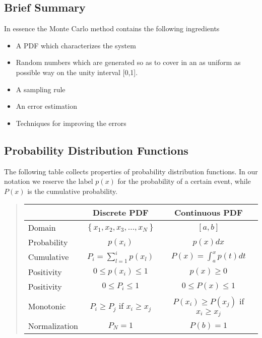 \documentclass[%
oneside,                 %
final,                   %
10pt]{article}
\newenvironment{block_mdfboxadmon}[1][]{
\begin{block_mdfboxmdframed}[frametitle=#1]
}
{
\end{block_mdfboxmdframed}
}
\begin{document}
\subsection{Brief Summary}

In essence the Monte Carlo method  contains the following ingredients

\begin{itemize}
  \item A PDF which characterizes the system

  \item Random numbers which are generated so as to cover in an as uniform as  possible way on the unity interval [0,1].

  \item A sampling rule

  \item An error estimation

  \item Techniques for improving the errors
\end{itemize}

\noindent
\subsection{Probability Distribution Functions}

\begin{block_mdfboxadmon}[]

The following table collects properties of probability distribution functions.
In our notation we reserve the label $p(x)$ for the probability of a certain event,
while $P(x)$ is the cumulative probability. 



\begin{quote}
\begin{tabular}{lcc}
\hline
\multicolumn{1}{c}{  } & \multicolumn{1}{c}{ Discrete PDF } & \multicolumn{1}{c}{ Continuous PDF } \\
\hline
Domain        & $\left\{x_1, x_2, x_3, \dots, x_N\right\}$ & $[a,b]$                            \\
Probability   & $p(x_i)$                                   & $p(x)dx$                           \\
Cumulative    & $P_i=\sum_{l=1}^ip(x_l)$                   & $P(x)=\int_a^xp(t)dt$              \\
Positivity    & $ 0\le p(x_i)\le 1$                        & $ p(x) \ge 0$                      \\
Positivity    & $ 0\le P_i\le 1$                           & $ 0\le P(x)\le 1$                  \\
Monotonic     & $P_i\ge P_j$ if $x_i\ge x_j$               & $P(x_i)\ge P(x_j)$ if $x_i\ge x_j$ \\
Normalization & $P_N=1$                                    & $P(b)=1$                           \\
\hline
\end{tabular}
\end{quote}

\noindent
\end{block_mdfboxadmon} %
\end{document}
